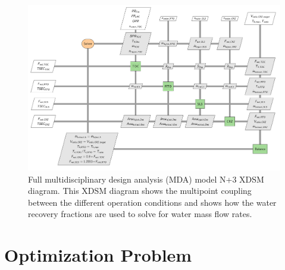 \documentclass[conf]{new-aiaa}
\begin{document}
\begin{figure}[hbt!]
    \centering
    \includegraphics[width=\textwidth]{N3_xdsm_full.pdf}
    \caption{
        Full multidisciplinary design analysis (MDA) model N+3 XDSM diagram.
        This XDSM diagram shows the multipoint coupling between the different operation conditions and shows how the water recovery fractions are used to solve for water mass flow rates.
    }
    \label{fig:N3_xdsm_full}
\end{figure}

\section{Optimization Problem}
\label{sec:optprob}
\end{document}
